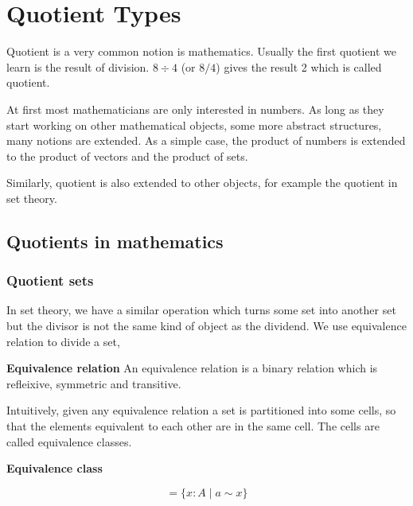 \chapter{Quotient Types}
\label{QuotientTypes} %


Quotient is a very common notion is mathematics. Usually the first
quotient we learn is the result of division. $8 \div 4$ (or $8 / 4$)
gives the result 2 which is called quotient.

At first most mathematicians are only interested in numbers. As long
as they start working on other mathematical objects, some more
abstract structures, many notions are extended. As a simple case, the
product of numbers is extended to the product of vectors and the
product of sets. 

Similarly, quotient is also extended to other objects, for example the
quotient in set theory.


\section{Quotients in mathematics}

\subsection{Quotient sets}
In set theory, we have a similar operation which turns some set
into another set but the divisor is not the same kind of object as the
dividend. We use equivalence relation to divide a set,

\begin{definition}

\textbf{Equivalence relation} An equivalence relation is a binary
relation which is refleixive, symmetric and transitive.

\end{definition}

Intuitively, given any equivalence relation a set is partitioned into
some cells, so that the elements equivalent to each other are in the
same cell. The cells are called equivalence classes.

\begin{definition}

\textbf{Equivalence class} 

\begin{equation}
[ a ] = \{x : A \;| \; a \sim x \}
\end{equation}

\end{definition}

